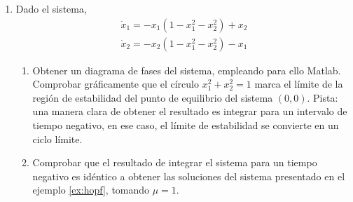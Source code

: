 \begin{enumerate}
\item Dado el sistema,
\begin{align*}
\dot x_1 = -x_1(1-x_1^2-x_2^2)+x_2\\
\dot x_2 = -x_2(1-x_1^2-x_2^2) -x_1
\end{align*}

\begin{enumerate}
\item Obtener un diagrama de fases del sistema, empleando para ello Matlab. Comprobar gráficamente que el círculo $x_1^2+x_2^2 = 1$  marca el límite de la región de estabilidad del punto de equilibrio del sistema $(0,0)$. Pista: una manera clara de obtener el resultado es integrar para un intervalo de tiempo negativo, en ese caso, el límite de estabilidad se convierte en un ciclo límite.
\item Comprobar que el resultado de integrar el sistema para un tiempo negativo es idéntico a obtener las soluciones del sistema presentado en el ejemplo \ref{ex:hopf}, tomando $\mu=1$.
\end{enumerate}

\end{enumerate}